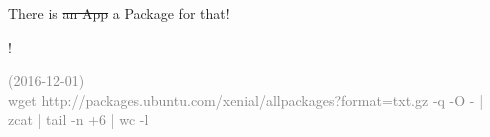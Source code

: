 \begin{frame}{There is \st{an App} a Package for that!}

\begin{center}
{\fontsize{100}{90}!}
\end{center}
\vfill

\textcolor{gray}{\tiny (2016-12-01) \\ wget http://packages.ubuntu.com/xenial/allpackages?format=txt.gz -q -O - | zcat | tail -n +6 | wc -l}
\end{frame}

